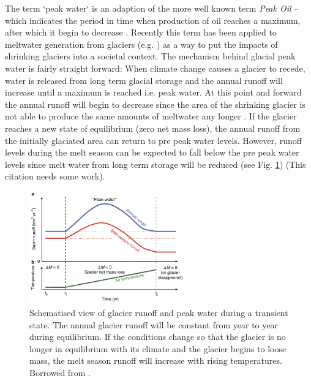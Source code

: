 \documentclass[12pt, a4paper]{article}
\begin{document}
The term `peak water` is an adaption of the more well known term \emph{Peak Oil}
-- which indicates the period in time when production of oil reaches a maximum,
after which it begin to decrease \parencite{gleickPeakWaterLimits2010}. Recently
this term has been applied to meltwater generation from glaciers (e.g.
\cite{hussGlobalscaleHydrologicalResponse2018}) as a way to put the impacts of
shrinking glaciers into a societal context. The mechanism behind glacial peak
water is fairly straight forward: When climate change causes a glacier to
recede, water is released from long term glacial storage and the annual runoff
will increase until a maximum is reached i.e. peak water. At this point and
forward the annual runoff will begin to decrease since the area of the shrinking
glacier is not able to produce the same amounts of meltwater any longer
\parencite{janssonConceptGlacierStorage2003}. If the glacier reaches a new state
of equilibrium (zero net mass loss), the annual runoff from the initially
glaciated area can return to pre peak water levels. However, runoff levels
during the melt season can be expected to fall below the pre peak water levels
since melt water from long term storage will be reduced 
\parencite{hussGlobalscaleHydrologicalResponse2018,
ragettliContrastingClimateChange2016, immerzeelRisingRiverFlows2013} (see Fig.
\ref{fig:peak_water}) (This citation needs some work). 
\begin{figure}[h]
    \centering
    \includegraphics[width=0.6\textwidth]{../peak_water.png}
    \caption{Schematised view of glacier runoff and peak water during a
    transient state. The annual glacier runoff will be constant from year to
    year during equilibrium. If the conditions change so that the glacier is no
    longer in equilibrium with its climate and the glacier begins to loose mass,
    the melt season runoff will increase with rising temperatures.
    Borrowed from \textcite{hussGlobalscaleHydrologicalResponse2018}.}
    \label{fig:peak_water}
\end{figure}
\end{document}
